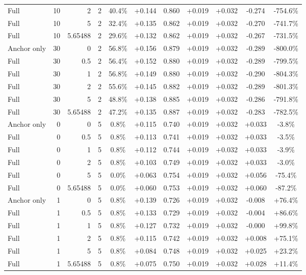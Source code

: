 \begin{table}[htbp]
\begin{tabular}{lrrrccccccc}
Full & 10 & 2 & 2 & 40.4\% & +0.144 & 0.860 & +0.019 & +0.032 & -0.274 & -754.6\% \\
Full & 10 & 5 & 2 & 32.4\% & +0.135 & 0.862 & +0.019 & +0.032 & -0.270 & -741.7\% \\
Full & 10 & 5.65488 & 2 & 29.6\% & +0.132 & 0.862 & +0.019 & +0.032 & -0.267 & -731.5\% \\
Anchor only & 30 & 0 & 2 & 56.8\% & +0.156 & 0.879 & +0.019 & +0.032 & -0.289 & -800.0\% \\
Full & 30 & 0.5 & 2 & 56.4\% & +0.152 & 0.880 & +0.019 & +0.032 & -0.289 & -799.5\% \\
Full & 30 & 1 & 2 & 56.8\% & +0.149 & 0.880 & +0.019 & +0.032 & -0.290 & -804.3\% \\
Full & 30 & 2 & 2 & 55.6\% & +0.145 & 0.882 & +0.019 & +0.032 & -0.289 & -801.3\% \\
Full & 30 & 5 & 2 & 48.8\% & +0.138 & 0.885 & +0.019 & +0.032 & -0.286 & -791.8\% \\
Full & 30 & 5.65488 & 2 & 47.2\% & +0.135 & 0.887 & +0.019 & +0.032 & -0.283 & -782.5\% \\
Anchor only & 0 & 0 & 5 & 0.8\% & +0.115 & 0.740 & +0.019 & +0.032 & +0.033 & -3.8\% \\
Full & 0 & 0.5 & 5 & 0.8\% & +0.113 & 0.741 & +0.019 & +0.032 & +0.033 & -3.5\% \\
Full & 0 & 1 & 5 & 0.8\% & +0.112 & 0.744 & +0.019 & +0.032 & +0.033 & -3.9\% \\
Full & 0 & 2 & 5 & 0.8\% & +0.103 & 0.749 & +0.019 & +0.032 & +0.033 & -3.0\% \\
Full & 0 & 5 & 5 & 0.0\% & +0.063 & 0.754 & +0.019 & +0.032 & +0.056 & -75.4\% \\
Full & 0 & 5.65488 & 5 & 0.0\% & +0.060 & 0.753 & +0.019 & +0.032 & +0.060 & -87.2\% \\
Anchor only & 1 & 0 & 5 & 0.8\% & +0.139 & 0.726 & +0.019 & +0.032 & -0.008 & +76.4\% \\
Full & 1 & 0.5 & 5 & 0.8\% & +0.133 & 0.729 & +0.019 & +0.032 & -0.004 & +86.6\% \\
Full & 1 & 1 & 5 & 0.8\% & +0.127 & 0.732 & +0.019 & +0.032 & -0.000 & +99.8\% \\
Full & 1 & 2 & 5 & 0.8\% & +0.115 & 0.742 & +0.019 & +0.032 & +0.008 & +75.1\% \\
Full & 1 & 5 & 5 & 0.8\% & +0.084 & 0.748 & +0.019 & +0.032 & +0.025 & +23.2\% \\
Full & 1 & 5.65488 & 5 & 0.8\% & +0.075 & 0.750 & +0.019 & +0.032 & +0.028 & +11.4\% \\

\end{tabular}
\end{table}
